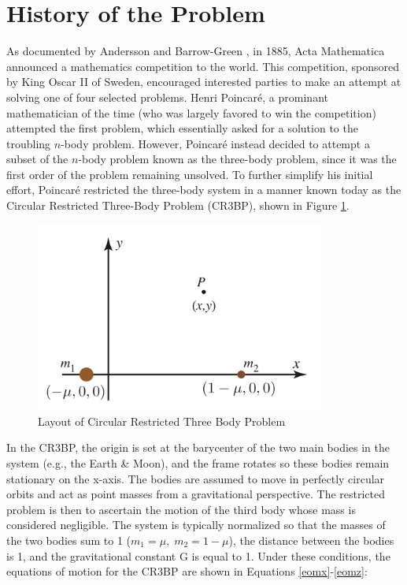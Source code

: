 \documentclass[11pt]{article} %
\begin{document}
\section*{History of the Problem} %
As documented by Andersson and Barrow-Green \cite{Andersson1994,BarrowGreen1994}, in 1885, Acta Mathematica announced a mathematics competition to the world. This competition, sponsored by King Oscar II of Sweden, encouraged interested parties to make an attempt at solving one of four selected problems. Henri Poincaré, a prominant mathematician of the time (who was largely favored to win the competition) attempted the first problem, which essentially asked for a solution to the troubling $n$-body problem. However, Poincaré instead decided to attempt a subset of the $n$-body problem known as the three-body problem, since it was the first order of the problem remaining unsolved. To further simplify his initial effort, Poincaré restricted the three-body system in a manner known today as the Circular Restricted Three-Body Problem (CR3BP), shown in Figure \ref{fig:CR3BP}. 

\begin{figure}[H]
\centering
\includegraphics[width=3.75in]{CR3BP.png}\nonumber
\caption{Layout of Circular Restricted Three Body Problem \cite{KoonLoMarsdenRoss2011}}
\label{fig:CR3BP}
\end{figure}

In the CR3BP, the origin is set at the barycenter of the two main bodies in the system (e.g., the Earth \& Moon), and the frame rotates so these bodies remain stationary on the x-axis. The bodies are assumed to move in perfectly circular orbits and act as point masses from a gravitational perspective. The restricted problem is then to ascertain the motion of the third body whose mass is considered negligible. The system is typically normalized so that the masses of the two bodies sum to 1 ($m_1 = \mu,\; m_2 = 1-\mu$), the distance between the bodies is 1, and the gravitational constant G is equal to 1. Under these conditions, the equations of motion for the CR3BP are shown in Equations \ref{eomx}-\ref{eomz}:
\end{document}
